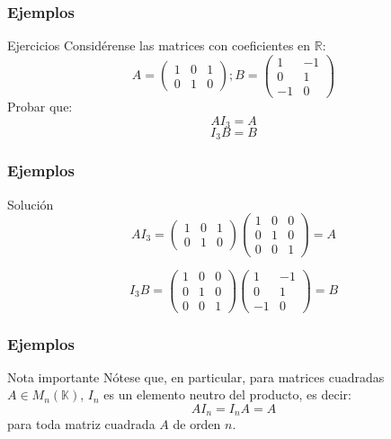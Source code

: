 \documentclass[12pt]{article}
\begin{document}
 
 
    \begin{frame}
  \frametitle{Ejemplos}
  
   \begin{block}{Ejercicios}
   Consid\'erense las matrices con coeficientes en $\mathbb{R}$:
  \[
  A = \left(\begin{array}{ccc}1 & 0 & 1 \\0 & 1 & 0\end{array}\right);
  B = \left(\begin{array}{cc}1 & -1 \\0 & 1 \\-1 & 0\end{array}\right)
  \]
  Probar que:
   \[AI_3 = A \]\[ I_3B = B \]

  \end{block}
 \end{frame} 


     \begin{frame}
  \frametitle{Ejemplos}
  
   \begin{block}{Soluci\'on}
  \[ AI_3= \left(\begin{array}{ccc}1 & 0 & 1 \\0 & 1 & 0\end{array}\right) 
  	\left(\begin{array}{ccc}1 & 0&0 \\0 & 1 &0 \\0 & 0 &1\end{array}\right) =
	A
  \]

  \[ I_3B =\left(\begin{array}{ccc}1 & 0&0 \\0 & 1 &0 \\0 & 0 &1\end{array}\right)
  \left(\begin{array}{cc}1 & -1 \\0 & 1 \\-1 & 0\end{array}\right) = B
  \]
  \end{block}


 \end{frame} 
 
 
      \begin{frame}
  \frametitle{Ejemplos}
  
   \begin{block}{Nota importante}
N\'otese que, en particular, para matrices cuadradas $A\in M_n(\mathbb{K})$, $I_n$ es un elemento neutro del producto, es decir:
\[AI_n = I_nA = A\]
para toda matriz cuadrada $A$ de orden $n$.
  \end{block}


 \end{frame} 
 
\end{document}
